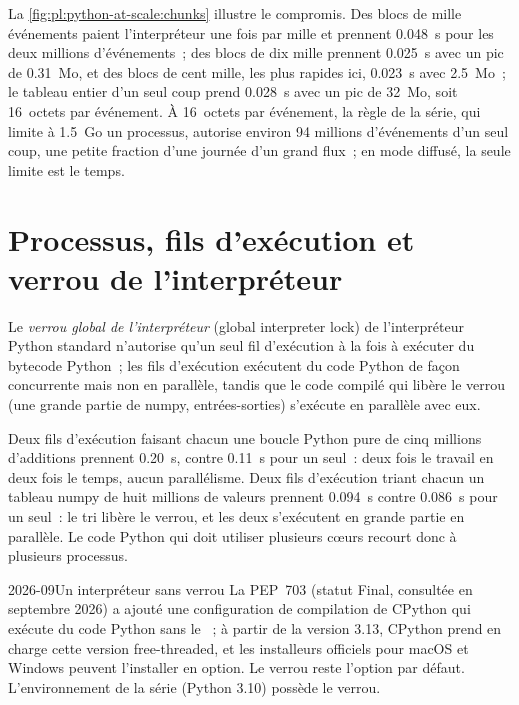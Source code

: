La \cref{fig:pl:python-at-scale:chunks} illustre le compromis. Des blocs de mille événements paient l'interpréteur une fois par mille et prennent
0.048~s pour les deux millions d'événements~; des blocs de dix mille prennent 0.025~s avec un pic de 0.31~Mo, et des blocs de cent mille,
les plus rapides ici, 0.023~s avec 2.5~Mo~; le tableau entier d'un seul coup prend 0.028~s avec un pic de 32~Mo, soit 16~octets par événement. À 16~octets par événement, la règle de la série, qui limite à 1.5~Go un processus, autorise environ
94 millions d'événements d'un seul coup, une petite fraction d'une journée d'un grand flux~; en mode diffusé, la seule limite est le temps.

\section{Processus, fils d'exécution et verrou de l'interpréteur}

\begin{definition}\label{def:pl:python-at-scale:gil}
Le \emph{verrou global de l'interpréteur} (global interpreter lock) de l'interpréteur Python standard n'autorise qu'un seul fil d'exécution à la fois à
exécuter du bytecode Python~; les fils d'exécution exécutent du code Python de façon concurrente mais non en parallèle, tandis que le code compilé qui libère le verrou (une grande partie
de numpy, entrées-sorties) s'exécute en parallèle avec eux.
\end{definition}

Deux fils d'exécution faisant chacun une boucle Python pure de cinq millions d'additions prennent 0.20~s, contre 0.11~s pour un seul~: deux fois le travail en deux fois
le temps, aucun parallélisme. Deux fils d'exécution triant chacun un tableau numpy de huit millions de valeurs prennent 0.094~s contre 0.086~s pour un seul~: le
tri libère le verrou, et les deux s'exécutent en grande partie en parallèle. Le code Python qui doit utiliser plusieurs cœurs recourt donc à plusieurs processus.

\begin{dated}{2026-09}{Un interpréteur sans verrou}\label{dat:pl:python-at-scale:freethreading}
La PEP~703 (statut Final, consultée en septembre 2026) a ajouté une configuration de compilation de CPython qui exécute du code Python sans le
~; à partir de la version 3.13, CPython prend en charge cette version free-threaded, et les installeurs officiels pour macOS et Windows
peuvent l'installer en option. Le verrou reste l'option par défaut. L'environnement de la série (Python 3.10) possède le verrou.
\end{dated}

